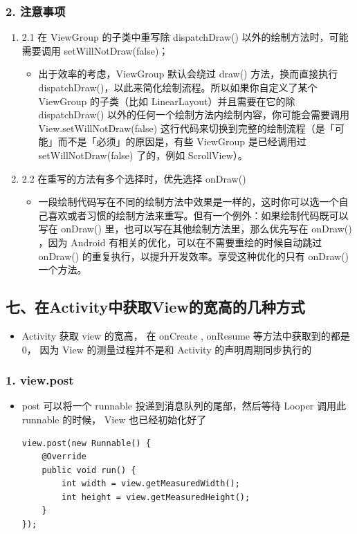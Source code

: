 \documentclass[9pt, b5paper]{article}
\begin{document}
\subsubsection{2. 注意事项}
\label{sec-1-6-2}
\begin{enumerate}
\item 2.1 在 ViewGroup 的子类中重写除 dispatchDraw() 以外的绘制方法时，可能需要调用 setWillNotDraw(false)；
\label{sec-1-6-2-1}
\begin{itemize}
\item 出于效率的考虑，ViewGroup 默认会绕过 draw() 方法，换而直接执行 dispatchDraw()，以此来简化绘制流程。所以如果你自定义了某个 ViewGroup 的子类（比如 LinearLayout）并且需要在它的除 dispatchDraw() 以外的任何一个绘制方法内绘制内容，你可能会需要调用 View.setWillNotDraw(false) 这行代码来切换到完整的绘制流程（是「可能」而不是「必须」的原因是，有些 ViewGroup 是已经调用过 setWillNotDraw(false) 了的，例如 ScrollView）。
\end{itemize}
\item 2.2 在重写的方法有多个选择时，优先选择 onDraw()
\label{sec-1-6-2-2}
\begin{itemize}
\item 一段绘制代码写在不同的绘制方法中效果是一样的，这时你可以选一个自己喜欢或者习惯的绘制方法来重写。但有一个例外：如果绘制代码既可以写在 onDraw() 里，也可以写在其他绘制方法里，那么优先写在 onDraw() ，因为 Android 有相关的优化，可以在不需要重绘的时候自动跳过 onDraw() 的重复执行，以提升开发效率。享受这种优化的只有 onDraw() 一个方法。
\end{itemize}
\end{enumerate}
\subsection{七、在Activity中获取View的宽高的几种方式}
\label{sec-1-7}
\begin{itemize}
\item Activity 获取 view 的宽高， 在 onCreate , onResume 等方法中获取到的都是0， 因为 View 的测量过程并不是和 Activity 的声明周期同步执行的
\end{itemize}
\subsubsection{1. view.post}
\label{sec-1-7-1}
\begin{itemize}
\item post 可以将一个 runnable 投递到消息队列的尾部，然后等待 Looper 调用此 runnable 的时候， View 也已经初始化好了
\begin{verbatim}
view.post(new Runnable() {
    @Override
    public void run() {
        int width = view.getMeasuredWidth();
        int height = view.getMeasuredHeight(); 
    }
});
\end{verbatim}
\end{itemize}
\end{document}
